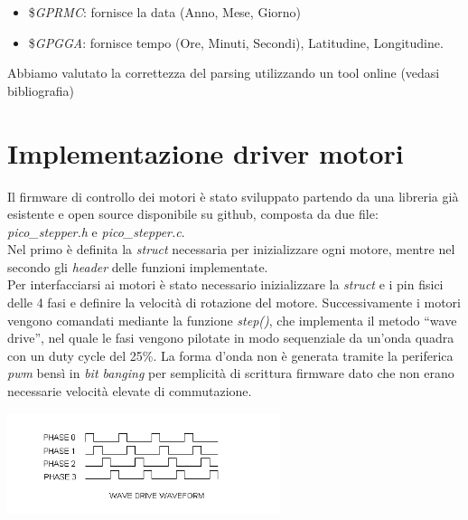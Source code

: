 \begin{itemize}
\item
  
  \$\emph{GPRMC}: fornisce la data (Anno, Mese, Giorno)
  
\item
  
  \$\emph{GPGGA}: fornisce tempo (Ore, Minuti, Secondi), Latitudine,
  Longitudine.
  
\end{itemize}

\noindent Abbiamo valutato la correttezza del parsing utilizzando un tool online
(vedasi bibliografia)

\hypertarget{implementazione-driver-motori}{%
\section{Implementazione driver
motori}\label{implementazione-driver-motori}}

\noindent Il firmware di controllo dei motori è stato sviluppato partendo da una
libreria già esistente e open source disponibile su github, composta
da due file: \emph{pico\_stepper.h} e \emph{pico\_stepper.c}.\\
Nel primo è definita la \emph{struct} necessaria per inizializzare ogni
motore, mentre nel secondo gli \emph{header} delle funzioni implementate.\\
Per interfacciarsi ai motori è stato necessario inizializzare la
\emph{struct} e i pin fisici delle 4 fasi e definire la velocità di
rotazione del motore. Successivamente i motori vengono comandati
mediante la funzione \emph{step()}, che implementa il metodo ``wave
drive'', nel quale le fasi vengono pilotate in modo sequenziale da
un'onda quadra con un duty cycle del 25\%. La forma d'onda non è
generata tramite la periferica \emph{pwm} bensì in \emph{bit banging}
per semplicità di scrittura firmware dato che non erano necessarie
velocità elevate di commutazione.

\begin{center}
\includegraphics[width=0.6\textwidth]{figures/image50.png}
\captionsetup{type=figure}
\end{center}

